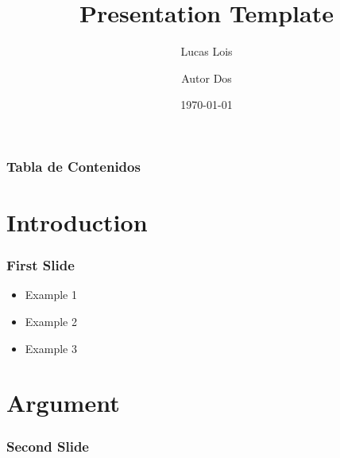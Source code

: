 \documentclass{beamer}
\title{Presentation Template}
\author[Lois]{
  Lucas Lois
  \and
  Autor Dos
}
\institute[]{Universidad Católica del Uruguay}
\date{\today}
\begin{document}
\frame{\titlepage}

\begin{frame}
\frametitle{Tabla de Contenidos}
\tableofcontents
\end{frame}

\section{Introduction}

\begin{frame}
  \frametitle{First Slide}

  \begin{itemize}
    \item<1> Example 1
    \item<2-> Example 2
    \item<3-> Example 3
  \end{itemize}
\end{frame}

\section{Argument}

\begin{frame}
  \frametitle{Second Slide}

  \blindtext
\end{frame}
\end{document}

